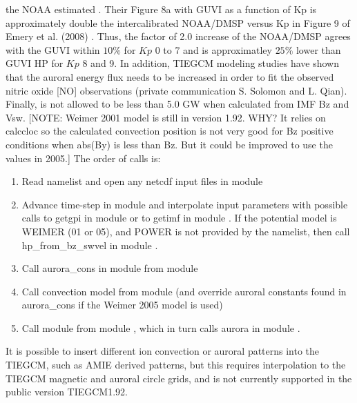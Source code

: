 the NOAA estimated .  Their Figure 8a with GUVI 
as a function of Kp  is approximately double the intercalibrated NOAA/DMSP 
versus Kp in Figure 9 of Emery et al. (2008) \cite{Emery2008}.  Thus,
the factor of 2.0  increase of the NOAA/DMSP  agrees
with the GUVI  within $10\%$ for $Kp$ 0 to 7 and is approximatley $25\%$ lower
than GUVI HP for $Kp$ 8 and 9.  In addition,
TIEGCM modeling studies have shown that the auroral energy flux needs
to be increased in order to fit the observed nitric oxide [NO] observations
(private communication S. Solomon and L. Qian).  Finally,
 is not allowed to be less than 5.0 GW when calculated from IMF
Bz and Vsw.
%
[NOTE: Weimer 2001 model \cite{Weimer2001} is still in version 1.92.
WHY?  It relies on
calccloc so the calculated convection position is not very good
for Bz positive conditions when abs(By) is less than Bz.
But it could be improved to use the values in 2005.]
%
The order of calls is:
%
\begin{enumerate}
\item Read namelist and open any netcdf input files in module 
\item Advance time-step in module  and interpolate input
parameters with possible calls to getgpi in module  or to
getimf in module .  If the potential model is WEIMER (01 or 05),
and POWER is not provided by the namelist, then call hp\_from\_bz\_swvel in
module .
\item Call aurora\_cons in module  from module 
\item Call convection model from module  (and override auroral
constants found in aurora\_cons if the Weimer 2005 model is used)
\item Call module  from module , which in turn
calls aurora in module .
% 
\end{enumerate}
%
It is possible to insert different ion convection or auroral patterns into the
TIEGCM, such as AMIE derived patterns, but this requires interpolation to the
TIEGCM magnetic and auroral circle grids, and is not currently supported in the
public version TIEGCM1.92.
%
